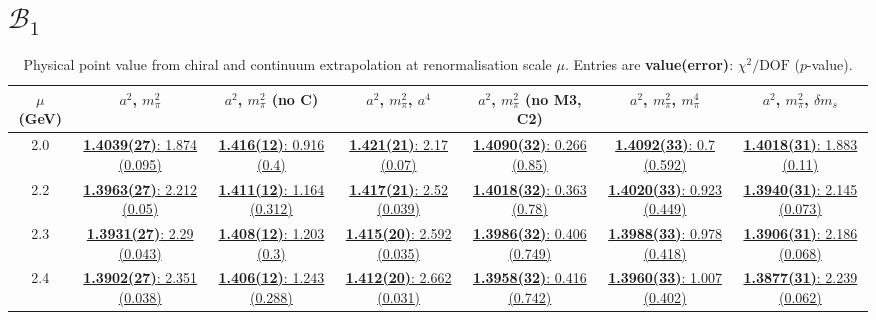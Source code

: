 \documentclass[12pt]{extarticle}
\begin{document}
\section{$\mathcal{B}_1$}
\begin{table}[h!]
\begin{center}
\begin{tabular}{|c|c|c|c|c|c|c|}
\hline
$\mu$ (GeV) & $a^2$, $m_\pi^2$& $a^2$, $m_\pi^2$ (no C)& $a^2$, $m_\pi^2$, $a^4$& $a^2$, $m_\pi^2$ (no M3, C2)& $a^2$, $m_\pi^2$, $m_\pi^4$& $a^2$, $m_\pi^2$, $\delta m_s$\\
\hline
2.0& \hyperlink{VVpAA/NPR/bag_a2m2_20.pdf.1}{\textbf{1.4039(27)}: 1.874 (0.095)} & \hyperlink{VVpAA/NPR/bag_a2m2noC_20.pdf.1}{\textbf{1.416(12)}: 0.916 (0.4)} & \hyperlink{VVpAA/NPR/bag_a2a4m2_20.pdf.1}{\textbf{1.421(21)}: 2.17 (0.07)} & \hyperlink{VVpAA/NPR/bag_a2m2mcut_20.pdf.1}{\textbf{1.4090(32)}: 0.266 (0.85)} & \hyperlink{VVpAA/NPR/bag_a2m2m4_20.pdf.1}{\textbf{1.4092(33)}: 0.7 (0.592)} & \hyperlink{VVpAA/NPR/bag_a2m2delm_20.pdf.1}{\textbf{1.4018(31)}: 1.883 (0.11)}\\
2.2& \hyperlink{VVpAA/NPR/bag_a2m2_22.pdf.1}{\textbf{1.3963(27)}: 2.212 (0.05)} & \hyperlink{VVpAA/NPR/bag_a2m2noC_22.pdf.1}{\textbf{1.411(12)}: 1.164 (0.312)} & \hyperlink{VVpAA/NPR/bag_a2a4m2_22.pdf.1}{\textbf{1.417(21)}: 2.52 (0.039)} & \hyperlink{VVpAA/NPR/bag_a2m2mcut_22.pdf.1}{\textbf{1.4018(32)}: 0.363 (0.78)} & \hyperlink{VVpAA/NPR/bag_a2m2m4_22.pdf.1}{\textbf{1.4020(33)}: 0.923 (0.449)} & \hyperlink{VVpAA/NPR/bag_a2m2delm_22.pdf.1}{\textbf{1.3940(31)}: 2.145 (0.073)}\\
2.3& \hyperlink{VVpAA/NPR/bag_a2m2_23.pdf.1}{\textbf{1.3931(27)}: 2.29 (0.043)} & \hyperlink{VVpAA/NPR/bag_a2m2noC_23.pdf.1}{\textbf{1.408(12)}: 1.203 (0.3)} & \hyperlink{VVpAA/NPR/bag_a2a4m2_23.pdf.1}{\textbf{1.415(20)}: 2.592 (0.035)} & \hyperlink{VVpAA/NPR/bag_a2m2mcut_23.pdf.1}{\textbf{1.3986(32)}: 0.406 (0.749)} & \hyperlink{VVpAA/NPR/bag_a2m2m4_23.pdf.1}{\textbf{1.3988(33)}: 0.978 (0.418)} & \hyperlink{VVpAA/NPR/bag_a2m2delm_23.pdf.1}{\textbf{1.3906(31)}: 2.186 (0.068)}\\
2.4& \hyperlink{VVpAA/NPR/bag_a2m2_24.pdf.1}{\textbf{1.3902(27)}: 2.351 (0.038)} & \hyperlink{VVpAA/NPR/bag_a2m2noC_24.pdf.1}{\textbf{1.406(12)}: 1.243 (0.288)} & \hyperlink{VVpAA/NPR/bag_a2a4m2_24.pdf.1}{\textbf{1.412(20)}: 2.662 (0.031)} & \hyperlink{VVpAA/NPR/bag_a2m2mcut_24.pdf.1}{\textbf{1.3958(32)}: 0.416 (0.742)} & \hyperlink{VVpAA/NPR/bag_a2m2m4_24.pdf.1}{\textbf{1.3960(33)}: 1.007 (0.402)} & \hyperlink{VVpAA/NPR/bag_a2m2delm_24.pdf.1}{\textbf{1.3877(31)}: 2.239 (0.062)}\\
\hline
\end{tabular}
\caption{Physical point value from chiral and continuum extrapolation at renormalisation scale $\mu$. Entries are \textbf{value(error)}: $\chi^2/\text{DOF}$ ($p$-value).}
\end{center}
\end{table}
\end{document}
